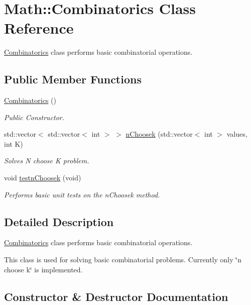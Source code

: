 \hypertarget{class_math_1_1_combinatorics}{}\section{Math\+:\+:Combinatorics Class Reference}
\label{class_math_1_1_combinatorics}


\mbox{\hyperlink{class_math_1_1_combinatorics}{Combinatorics}} class performs basic combinatorial operations.  


\subsection*{Public Member Functions}
\begin{DoxyCompactItemize}
\item 
\mbox{\hyperlink{class_math_1_1_combinatorics_a1ffcb284d73e71e575b71a09a23fa3de}{Combinatorics}} ()
\begin{DoxyCompactList}\small\item\em Public Constructor. \end{DoxyCompactList}\item 
std\+::vector$<$ std\+::vector$<$ int $>$ $>$ \mbox{\hyperlink{class_math_1_1_combinatorics_af5de2305b6a51f21bc920a1bc07a9163}{n\+Choosek}} (std\+::vector$<$ int $>$ values, int K)
\begin{DoxyCompactList}\small\item\em Solves N choose K problem. \end{DoxyCompactList}\item 
void \mbox{\hyperlink{class_math_1_1_combinatorics_a174253b11651917aab46bc879449e59b}{testn\+Choosek}} (void)
\begin{DoxyCompactList}\small\item\em Performs basic unit tests on the n\+Choosek method. \end{DoxyCompactList}\end{DoxyCompactItemize}


\subsection{Detailed Description}
\mbox{\hyperlink{class_math_1_1_combinatorics}{Combinatorics}} class performs basic combinatorial operations. 

This class is used for solving basic combinatorial problems. Currently only \char`\"{}n choose k\char`\"{} is implemented. 

\subsection{Constructor \& Destructor Documentation}
\mbox{\label{class_math_1_1_combinatorics_a1ffcb284d73e71e575b71a09a23fa3de}} 
